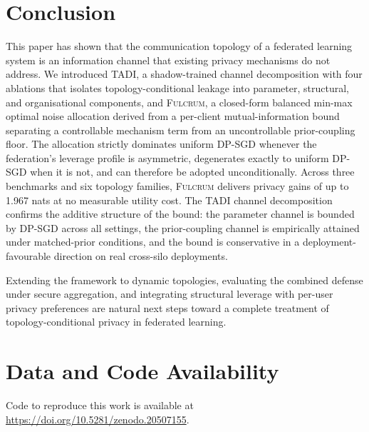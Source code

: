 \documentclass[letterpaper,journal]{IEEEtran}
\newcommand{\TADI}{\textsc{TADI}\xspace}
\newcommand{\Fulcrum}{\textsc{Fulcrum}\xspace}
\begin{document}
\section{Conclusion}
\label{sec:conclusion}

This paper has shown that the communication topology of a federated
learning system is an information channel that existing privacy
mechanisms do not address. We introduced \TADI, a shadow-trained
channel decomposition with four ablations that isolates
topology-conditional leakage into parameter, structural, and
organisational components, and \Fulcrum, a closed-form balanced
min-max optimal noise allocation derived from a per-client
mutual-information bound separating a controllable mechanism term
from an uncontrollable prior-coupling floor. The allocation strictly
dominates uniform DP-SGD whenever the federation's leverage profile
is asymmetric, degenerates exactly to uniform DP-SGD when it is
not, and can therefore be adopted unconditionally. Across three
benchmarks and six topology families, \Fulcrum delivers privacy
gains of up to 1.967 nats at no measurable utility cost. The \TADI
channel decomposition confirms the additive structure of the bound:
the parameter channel is bounded by DP-SGD across all settings, the
prior-coupling channel is empirically attained under matched-prior
conditions, and the bound is conservative in a deployment-favourable
direction on real cross-silo deployments.

Extending the framework to dynamic topologies, evaluating the
combined defense under secure aggregation, and integrating structural
leverage with per-user privacy preferences are natural next steps
toward a complete treatment of topology-conditional privacy in
federated learning.

\section*{Data and Code Availability}
\noindent Code to reproduce this work is available at
\url{https://doi.org/10.5281/zenodo.20507155}.




\end{document}
